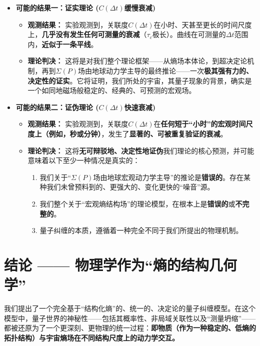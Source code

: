 \documentclass[12pt]{article}
\begin{document}
\begin{itemize}
    \item   \textbf{可能的结果一：证实理论 ($C(\Delta t)$缓慢衰减)}
        \begin{itemize}
            \item   \textbf{观测结果：} 实验观测到，关联度$C(\Delta t)$在小时、天甚至更长的时间尺度上，\textbf{几乎没有发生任何可测量的衰减}（$\tau_c$极长）。曲线在可测量的$\Delta t$范围内，\textbf{近似于一条平线}。
            \item   \textbf{理论判决：} 这将是对我们整个理论框架——从熵场本体论，到超决定论机制，再到$\Sigma(P)$场由地球动力学主导的最终推论——一次\textbf{极其强有力的、决定性的证实}。它将证明，我们所处的宇宙，其量子现象的背景，确实是一个如同地磁场般稳定的、经典的、可预测的宏观场。
        \end{itemize}

    \item   \textbf{可能的结果二：证伪理论 ($C(\Delta t)$快速衰减)}
        \begin{itemize}
            \item   \textbf{观测结果：} 实验观测到，关联度$C(\Delta t)$在\textbf{任何短于``小时''的宏观时间尺度上（例如，秒或分钟）}，发生了\textbf{显著的、可被重复验证的衰减}。
            \item   \textbf{理论判决：} 这将\textbf{无可辩驳地、决定性地证伪}我们理论的核心预测，并可能意味着以下至少一种情况是真实的：
                \begin{enumerate}
                    \item   我们关于``$\Sigma(P)$场由地球宏观动力学主导''的推论是\textbf{错误的}。存在某种我们未曾预料到的、更强大的、变化更快的``噪音''源。
                    \item   我们整个关于``宏观熵结构场''的理论模型，在根本上是\textbf{错误的}或\textbf{不完整的}。
                    \item   量子纠缠的本质，遵循着一种完全不同于我们所提出的物理机制。
                \end{enumerate}
        \end{itemize}
\end{itemize}



\section{结论 —— 物理学作为``熵的结构几何学''}

我们提出了一个完全基于``结构化熵''的、统一的、决定论的量子纠缠模型。在这个模型中，量子世界的神秘性——包括其概率性、非局域关联性以及``测量坍缩''——都被还原为了一个更深刻、更物理的统一过程：\textbf{即物质（作为一种稳定的、低熵的拓扑结构）与宇宙熵场在不同结构尺度上的动力学交互。}
\end{document}
